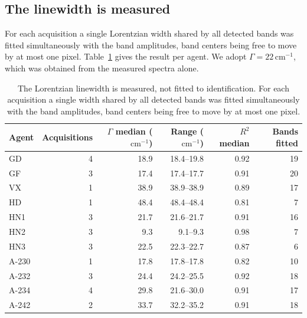 \documentclass[11pt]{article}
\newcommand*\wn{\ensuremath{\text{cm}^{-1}}}
\begin{document}
\subsection{The linewidth is measured}

For each acquisition a single Lorentzian width shared by all detected bands was fitted
simultaneously with the band amplitudes, band centers being free to move by at most one
pixel. Table~\ref{tab:si-gamma} gives the result per agent. We adopt
$\Gamma = 22$\,\wn{}, which was obtained from the measured spectra alone.

\begin{table}[htbp]
\centering
\caption{The Lorentzian linewidth is measured, not fitted to identification. For each acquisition a single width shared by all detected bands was fitted simultaneously with the band amplitudes, band centers being free to move by at most one pixel.}
\label{tab:si-gamma}
\small
\begin{tabular}{lrrrrr}
\toprule
Agent & Acquisitions & $\Gamma$ median (\wn) & Range (\wn) & $R^2$ median & Bands fitted \\
\midrule
GD & 4 & 18.9 & 18.4--19.8 & 0.92 & 19 \\
GF & 3 & 17.4 & 17.4--17.7 & 0.91 & 20 \\
VX & 1 & 38.9 & 38.9--38.9 & 0.89 & 17 \\
HD & 1 & 48.4 & 48.4--48.4 & 0.81 & 7 \\
HN1 & 3 & 21.7 & 21.6--21.7 & 0.91 & 16 \\
HN2 & 3 & 9.3 & 9.1--9.3 & 0.98 & 7 \\
HN3 & 3 & 22.5 & 22.3--22.7 & 0.87 & 6 \\
A-230 & 1 & 17.8 & 17.8--17.8 & 0.82 & 10 \\
A-232 & 3 & 24.4 & 24.2--25.5 & 0.92 & 18 \\
A-234 & 4 & 29.8 & 21.6--30.0 & 0.91 & 17 \\
A-242 & 2 & 33.7 & 32.2--35.2 & 0.91 & 18 \\
\bottomrule
\end{tabular}


\end{table}
\end{document}

